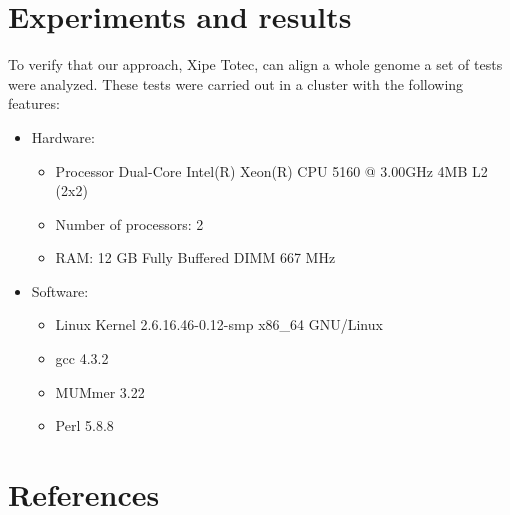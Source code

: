\documentclass[3p,times]{elsarticle}
\begin{document}
\section{Experiments and results}
To verify that our approach, Xipe Totec, can align a whole genome a set of tests were analyzed. These tests were carried out in a cluster with the following features:
\begin{itemize}
\item Hardware: 
\begin{itemize}
\item Processor Dual-Core Intel(R) Xeon(R) CPU 5160 @ 3.00GHz 4MB L2 (2x2)
\item Number of processors: 2
\item RAM: 12 GB Fully Buffered DIMM 667 MHz
\end{itemize}
\item  Software:
\begin{itemize}
\item Linux Kernel 2.6.16.46-0.12-smp x86\_64 GNU/Linux
\item gcc 4.3.2
\item MUMmer 3.22
\item Perl 5.8.8
\end{itemize}
\end{itemize}



\section*{References}


\end{document}
